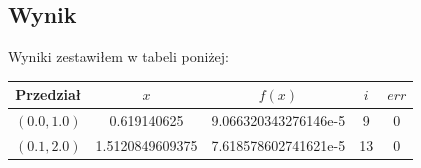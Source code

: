 \subsection{Wynik}
Wyniki zestawiłem w tabeli poniżej: \\
\begin{center}
\begin{tabular}{|c|c|c|c|c|}
  \hline 
    Przedział & $x$ & $ f(x)$ & $i$ & $err$ \\
  \hline
  $ (0.0, 1.0) $ & 0.619140625 & 9.066320343276146e-5 & 9 & 0\\
  \hline 
  $ (0.1, 2.0) $ & 1.5120849609375 & 7.618578602741621e-5 & 13 & 0\\
  \hline
\end{tabular} 
\end{center}
